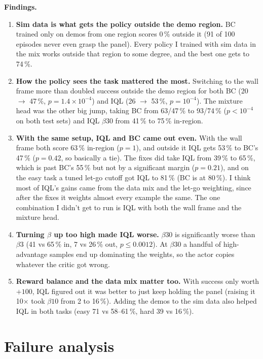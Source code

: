 \documentclass[10pt]{article}
\newcommand{\pct}{\,\%}
\newcommand{\para}[1]{\textbf{#1}}
\begin{document}
\para{Findings.}
\begin{enumerate}[itemsep=.4ex]
  \item \para{Sim data is what gets the policy outside the demo region.} BC trained only on demos from one
    region scores 0\pct{} outside it (91 of 100 episodes never even grasp the panel). Every policy I trained
    with sim data in the mix works outside that region to some degree, and the best one gets to 74\pct.
  \item \para{How the policy sees the task mattered the most.} Switching to the wall frame more than doubled
    success outside the demo region for both BC (20 $\to$ 47\pct, $p = 1.4 \times 10^{-4}$) and IQL
    (26 $\to$ 53\pct, $p = 10^{-4}$). The mixture head was the other big jump, taking BC from 63/47\pct{} to
    93/74\pct{} ($p < 10^{-4}$ on both test sets) and IQL $\beta 30$ from 41\pct{} to 75\pct{} in-region.
  \item \para{With the same setup, IQL and BC came out even.} With the wall frame both score 63\pct{}
    in-region ($p = 1$), and outside it IQL gets 53\pct{} to BC's 47\pct{} ($p = 0.42$, so basically a tie).
    The fixes did take IQL from 39\pct{} to 65\pct, which is past BC's 55\pct{} but not by a significant
    margin ($p = 0.21$), and on the easy task a tuned let-go cutoff got IQL to 81\pct{} (BC is at 80\pct).
    I think most of IQL's gains came from the data mix and the let-go weighting, since after the fixes it
    weights almost every example the same. The one combination I didn't get to run is IQL with both the wall
    frame and the mixture head.
  \item \para{Turning $\beta$ up too high made IQL worse.} $\beta 30$ is significantly worse than $\beta 3$
    (41 vs 65\pct{} in, 7 vs 26\pct{} out, $p \le 0.0012$). At $\beta 30$ a handful of high-advantage samples
    end up dominating the weights, so the actor copies whatever the critic got wrong.
  \item \para{Reward balance and the data mix matter too.} With success only worth $+100$, IQL figured out
    it was better to just keep holding the panel (raising it 10$\times$ took $\beta 10$ from 2 to 16\pct).
    Adding the demos to the sim data also helped IQL in both tasks (easy 71 vs 58--61\pct, hard 39 vs 16\pct).
\end{enumerate}

\section{Failure analysis}\label{sec:failures}
\end{document}
